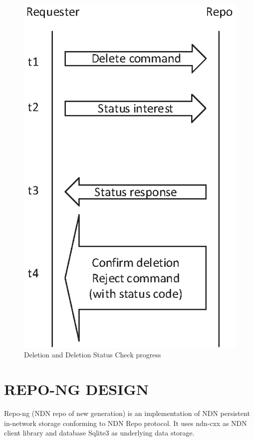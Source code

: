 \documentclass{acm_proc_article-sp}
\begin{document}
\begin{figure}
\centering
\includegraphics{Drawing4.eps}
\caption{Deletion and Deletion Status Check progress}
\end{figure}


\section{REPO-NG DESIGN}
Repo-ng (NDN repo of new generation) is an implementation of NDN persistent in-network storage conforming to NDN Repo protocol. It uses ndn-cxx as NDN client library and database Sqlite3 as underlying data storage.
\end{document}

